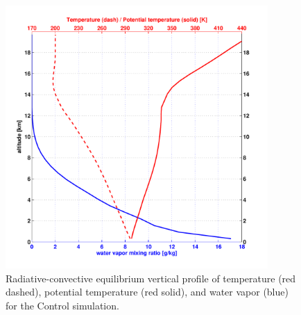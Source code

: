 \documentclass[12pt]{article}
\begin{document}

{}
{\clearpage}



\begin{figure}[h!]
\centering
  \noindent\includegraphics[width=10cm,height=10cm]{FIGURES_TC_RCE_equilibrium_v2.0/Fig0half_Sounding_ctrl.pdf}
\caption{Radiative-convective equilibrium vertical profile of temperature (red dashed), potential temperature (red solid), and water vapor (blue) for the Control simulation.}
\label{fig:ctrlsounding}
\end{figure}
\end{document}
